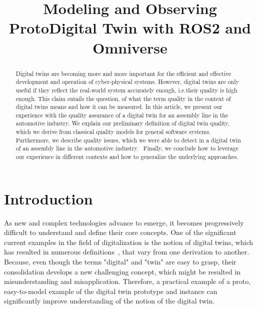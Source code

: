 \documentclass[conference]{IEEEtran}
\begin{document}
    \title{Modeling and Observing ProtoDigital Twin with ROS2 and Omniverse}
    \author{ 
    }
    
    \maketitle

    \begin{abstract}
        Digital twins are becoming more and more important for the efficient and effective development and operation of cyber-physical systems.
        However, digital twins are only useful if they reflect the real-world system accurately enough, i.e.their quality is high enough. 
        This claim entails the question, of what the term quality in the context of digital twins means and how it can be measured. 
        In this article, we present our experience with the quality assurance of a digital twin for an assembly line in the automotive industry.
        We explain our preliminary definition of digital twin quality, which we derive from classical quality models for general software systems. 
        Furthermore, we describe quality issues, which we were able to detect in a digital twin of an assembly line in the automotive industry. \
        Finally, we conclude how to leverage our experience in different contexts and how to generalize the underlying approaches.
    \end{abstract}

    \section{Introduction}\label{section:introduction}
    As new and complex technologies advance to emerge, it becomes progressively difficult to understand and define their core concepts.
    One of the significant current examples in the field of digitalization is the notion of digital twins, which has resulted in numerous definitions~\cite{Review1}, 
    that vary from one derivation to another. Because, even though the terms "digital" and "twin" are easy to grasp, their consolidation develops a new challenging concept, 
    which might be resulted in misunderstanding and misapplication. Therefore, a practical example of a proto, easy-to-model example of the digital twin prototype and instance 
    can significantly improve understanding of the notion of the digital twin.
    
\end{document}
